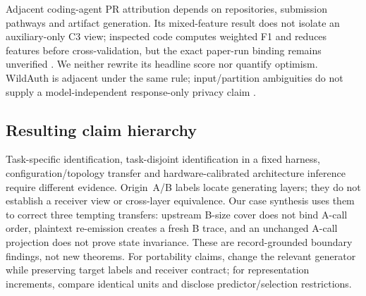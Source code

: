 Adjacent coding-agent PR attribution depends on repositories, submission pathways and artifact generation. Its mixed-feature result does not isolate an auxiliary-only C3 view; inspected code computes weighted F1 and reduces features before cross-validation, but the exact paper-run binding remains unverified \cite{ghaleb2026codingfingerprint}. We neither rewrite its headline score nor quantify optimism. WildAuth is adjacent under the same rule; input/partition ambiguities do not supply a model-independent response-only privacy claim \cite{wang2026dialogue}.

\subsection{Resulting claim hierarchy}
Task-specific identification, task-disjoint identification in a fixed harness, configuration/topology transfer and hardware-calibrated architecture inference require different evidence. Origin~A/B labels locate generating layers; they do not establish a receiver view or cross-layer equivalence. Our case synthesis uses them to correct three tempting transfers: upstream B-size cover does not bind A-call order, plaintext re-emission creates a fresh B trace, and an unchanged A-call projection does not prove state invariance. These are record-grounded boundary findings, not new theorems. For portability claims, change the relevant generator while preserving target labels and receiver contract; for representation increments, compare identical units and disclose predictor/selection restrictions.
